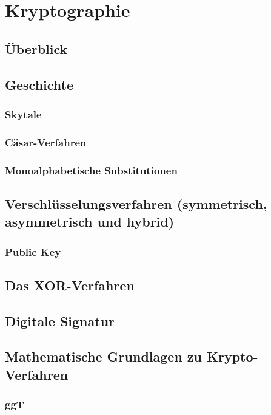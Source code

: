\section{Kryptographie}

\subsection{Überblick}

\subsection{Geschichte}
\subsubsection*{Skytale}
\subsubsection*{Cäsar-Verfahren}
\subsubsection*{Monoalphabetische Substitutionen}

\subsection{Verschlüsselungsverfahren (symmetrisch, asymmetrisch und hybrid)}
\subsubsection*{Public Key}

\subsection{Das XOR-Verfahren}

\subsection{Digitale Signatur}
\label{subsec:digitale-signatur}

\subsection{Mathematische Grundlagen zu Krypto-Verfahren}
\subsubsection*{ggT}
